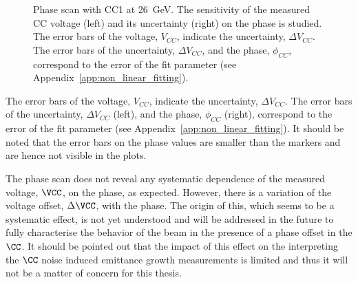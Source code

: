 \begin{figure}[!ht]
\begin{subfigure}[t]{0.45\textwidth}
   \end{subfigure}
   \hfill
    \caption{Phase scan with CC1 at 26\, GeV. The sensitivity of the measured CC voltage (left) and its uncertainty (right) on the phase is studied. The error bars of the voltage, $V_{CC}$, indicate the uncertainty, $\Delta V_{CC}$. The error bars of the uncertainty, $\Delta V_{CC}$, and the phase, $\phi_{CC}$, correspond to the error of the fit parameter (see Appendix~\ref{app:non_linear_fitting}).
    }
    \label{fig:phase_scan_CC1}
\end{figure}

The error bars of the voltage, $V_{CC}$, indicate the uncertainty, $\Delta V_{CC}$. The error bars of the uncertainty, $\Delta V_{CC}$ (left), and the phase, $\phi_{CC}$ (right), correspond to the error of the fit parameter (see Appendix~\ref{app:non_linear_fitting}). It should be noted that the error bars on the 
phase values are smaller than the markers and are hence not visible in the plots. 

The phase scan does not reveal any systematic dependence of the measured voltage, $\VCC$, on the phase, as expected. However, there is a variation of the voltage offset, $\Delta \VCC$, with the phase. The origin of this, which seems to be a systematic effect, is not yet understood and will be addressed in the future to fully characterise the behavior of the beam in the presence of a phase offset in the $\CC$. It should be pointed out that the impact of this effect on the interpreting the $\CC$ noise induced emittance growth measurements is limited and thus it will not be a matter of concern for this thesis. 

